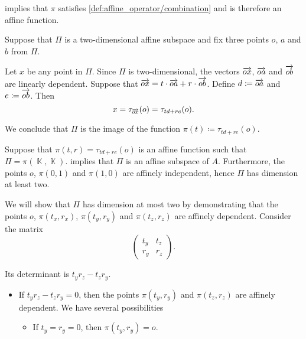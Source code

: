 \begin{defproof}
    implies that \( \pi \) satisfies \cref{def:affine_operator/combination} and is therefore an affine function.

   Suppose that \( \Pi \) is a two-dimensional affine subspace and fix three points \( o \), \( a \) and \( b \) from \( \Pi \).

  Let \( x \) be any point in \( \Pi \). Since \( \Pi \) is two-dimensional, the vectors \( \overrightarrow{ox} \), \( \overrightarrow{oa} \) and \( \overrightarrow{ob} \) are linearly dependent. Suppose that \( \overrightarrow{ox} = t \cdot \overrightarrow{oa} + r \cdot \overrightarrow{ob} \). Define \( d \coloneqq \overrightarrow{oa} \) and \( e \coloneqq \overrightarrow{ob} \). Then
  \begin{equation*}
    x = \tau_{\overrightarrow{ox}}(o) = \tau_{td + re}(o).
  \end{equation*}

  We conclude that \( \Pi \) is the image of the function \( \pi(t) \coloneqq \tau_{td + re}(o) \).

   Suppose that \( \pi(t, r) = \tau_{td + re}(o) \) is an affine function such that \( \Pi = \pi(\BbbK, \BbbK) \).  implies that \( \Pi \) is an affine subspace of \( A \). Furthermore, the points \( o \), \( \pi(0, 1) \) and \( \pi(1, 0) \) are affinely independent, hence \( \Pi \) has dimension at least two.

  We will show that \( \Pi \) has dimension at most two by demonstrating that the points \( o \), \( \pi(t_x, r_x) \), \( \pi(t_y, r_y) \) and \( \pi(t_z, r_z) \) are affinely dependent. Consider the matrix
  \begin{equation*}
    \begin{pmatrix}
      t_y & t_z \\
      r_y & r_z
    \end{pmatrix}.
  \end{equation*}

  Its determinant is \( t_y r_z - t_z r_y \).

  \begin{itemize}
    \item If \( t_y r_z - t_z r_y = 0 \), then the points \( \pi(t_y, r_y) \) and \( \pi(t_z, r_z) \) are affinely dependent. We have several possibilities
    \begin{itemize}
      \item If \( t_y = r_y = 0 \), then \( \pi(t_y, r_y) = o \).


\end{itemize}
\end{itemize}
\end{defproof}

